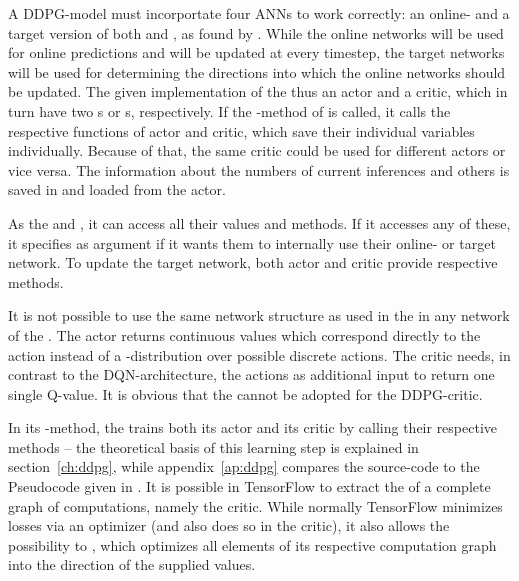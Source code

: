 A DDPG-model must incorportate four ANNs to work correctly: an online- and a target version of both  and , as found by \cite{lillicrap_continuous_2015}.  While the online networks will be used for online predictions and will be updated at every timestep, the target networks will be used for determining the directions into which the online networks should be updated. The given implementation of the  thus  an actor and a critic, which in turn have two s or s, respectively. If the -method of  is called, it calls the respective functions of actor and critic, which save their individual variables individually. Because of that, the same critic could be used for different actors or vice versa. The information about the numbers of current inferences and others is saved in and loaded from the actor.

As the    and , it can access all their values and methods. If it accesses any of these, it specifies as argument if it wants them to internally use their online- or target network. To update the target network, both actor and critic provide respective methods.

It is not possible to use the same network structure as used in the  in any network of the . The actor returns continuous values which correspond directly to the action instead of a -distribution over possible discrete actions. The critic needs, in contrast to the DQN-architecture, the actions as additional input to return one single Q-value. It is obvious that the  cannot be adopted for the DDPG-critic.

In its -method, the  trains both its actor and its critic by calling their respective methods -- the theoretical basis of this learning step is explained in section~\ref{ch:ddpg}, while appendix~\ref{ap:ddpg} compares the source-code to the Pseudocode given in \cite{lillicrap_continuous_2015}. It is possible in TensorFlow to extract the  of a complete graph of computations, namely the critic. While normally TensorFlow minimizes losses via an optimizer (and also does so in the critic), it also allows the possibility to , which optimizes all elements of its respective computation graph into the direction of the supplied values. 

